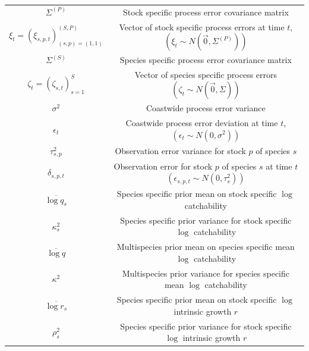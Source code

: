 \documentclass[]{scrartcl}
\begin{document}
\begin{table}[htbp]
\begin{center}
\begin{tabular}{c|c}
\hline
$\Sigma^{(P)}$ & Stock specific process error covariance matrix \\
$\xi_{t} = \left( \xi_{s,p,t} \right)_{(s,p) = (1,1)}^{(S,P)}$ & Vector of stock specific process errors at time $t$, $\left( \xi_t \sim N (\vec0, \Sigma^{(P)}) \right)$ \\
$\Sigma^{(S)}$ & Species specific process error covariance matrix \\
$\zeta_t = \left(\zeta_{s,t}\right)_{s=1}^S$ & Vector of species specific process errors $\left(\zeta_t \sim N ( \vec{0}, \Sigma)\right)$  \\
$\sigma^2$ & Coastwide process error variance \\
$\epsilon_{t}$ & Coastwide process error deviation at time $t$, $\left( \epsilon_{t} \sim N (0, \sigma^2) \right)$ \\
$\tau_{s,p}^2$ & Observation error variance for stock $p$ of species $s$ \\
$\delta_{s,p,t}$ & Observation error for stock $p$ of species $s$ at time $t$ $\left(\epsilon_{s,p,t} \sim N (0, \tau_s^2) \right)$ \\
$\overline{\log q_s}$ & Species specific prior mean on stock specific $\log$ catchability \\
$\kappa_s^2$ & Species specific prior variance for stock specific $\log$ catchability \\
$\overline{\log q}$ & Multispecies prior mean on species specific mean $\log$ catchability \\
$\kappa^2$ & Multispecies prior variance for species specific mean $\log$ catchability \\
$\overline{\log r_s}$ & Species specific prior mean on stock specific $\log$ intrinsic growth $r$ \\
$\rho_s^2$ & Species specific prior variance for stock specific $\log$ intrinsic growth $r$ \\
\hline
\end{tabular}
\end{center}
\end{table}

\newpage
\end{document}
